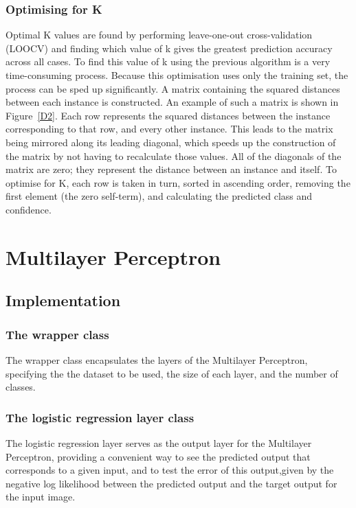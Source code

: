 \subsubsection{Optimising for K}
Optimal K values are found by performing leave-one-out cross-validation (LOOCV) and finding which value of k gives the greatest prediction accuracy across all cases. To find this value of k using the previous algorithm is a very time-consuming process. Because this optimisation uses only the training set, the process can be sped up significantly. A matrix containing the squared distances between each instance is constructed. An example of such a matrix is shown in Figure~\ref{D2}. Each row represents the squared distances between the instance corresponding to that row, and every other instance. This leads to the matrix being mirrored along its leading diagonal, which speeds up the construction of the matrix by not having to recalculate those values. All of the diagonals of the matrix are zero; they represent the distance between an instance and itself. To optimise for K, each row is taken in turn, sorted in ascending order, removing the first element (the zero self-term), and calculating the predicted class and confidence.

\section{Multilayer Perceptron}\label{meth:MLP}
\subsection{Implementation}
\subsubsection{The wrapper class}
The wrapper class encapsulates the layers of the Multilayer Perceptron, specifying the the dataset to be used, the size of each layer, and the number of classes.

\subsubsection{The logistic regression layer class}

The logistic regression layer serves as the output layer for the Multilayer Perceptron, providing a convenient way to see the predicted output that corresponds to a given input, and to test the error of this output,given by the negative log likelihood between the predicted output and the target output for the input image.

